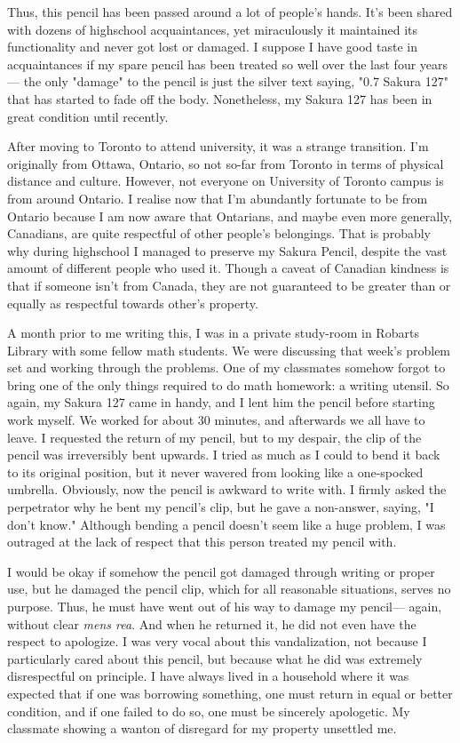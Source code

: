 \documentclass[12pt]{article}
\begin{document}
Thus, this pencil has been passed around a lot of people's hands. It's been shared with dozens of highschool acquaintances, yet miraculously it maintained its functionality and never got lost or damaged. I suppose I have good taste in acquaintances if my spare pencil has been treated so well over the last four years--- the only "damage" to the pencil is just the silver text saying, "0.7 Sakura 127" that has started to fade off the body. Nonetheless, my Sakura 127 has been in great condition until recently.

After moving to Toronto to attend university, it was a strange transition. I'm originally from Ottawa, Ontario, so not so-far from Toronto in terms of physical distance and culture. However, not everyone on University of Toronto campus is from around Ontario. I realise now that I'm abundantly fortunate to be from Ontario because I am now aware that Ontarians, and maybe even more generally, Canadians, are quite respectful of other people's belongings. That is probably why during highschool I managed to preserve my Sakura Pencil, despite the vast amount of different people who used it. Though a caveat of Canadian kindness is that if someone isn't from Canada, they are not guaranteed to be greater than or equally as respectful towards other's property.

A month prior to me writing this, I was in a private study-room in Robarts Library with some fellow math students. We were discussing that week's problem set and working through the problems. One of my classmates somehow forgot to bring one of the only things required to do math homework: a writing utensil. So again, my Sakura 127 came in handy, and I lent him the pencil before starting work myself. We worked for about 30 minutes, and afterwards we all have to leave. I requested the return of my pencil, but to my despair, the clip of the pencil was irreversibly bent upwards. I tried as much as I could to bend it back to its original position, but it never wavered from looking like a one-spocked umbrella. Obviously, now the pencil is awkward to write with. I firmly asked the perpetrator why he bent my pencil's clip, but he gave a non-answer, saying, "I don't know." Although bending a pencil doesn't seem like a huge problem, I was outraged at the lack of respect that this person treated my pencil with.

I would be okay if somehow the pencil got damaged through writing or proper use, but he damaged the pencil clip, which for all reasonable situations, serves no purpose. Thus, he must have went out of his way to damage my pencil--- again, without clear \textit{mens rea}. And when he returned it, he did not even have the respect to apologize. I was very vocal about this vandalization, not because I particularly cared about this pencil, but because what he did was extremely disrespectful on principle. I have always lived in a household where it was expected that if one was borrowing something, one must return in equal or better condition, and if one failed to do so, one must be sincerely apologetic. My classmate showing a wanton of disregard for my property unsettled me.
\end{document}
